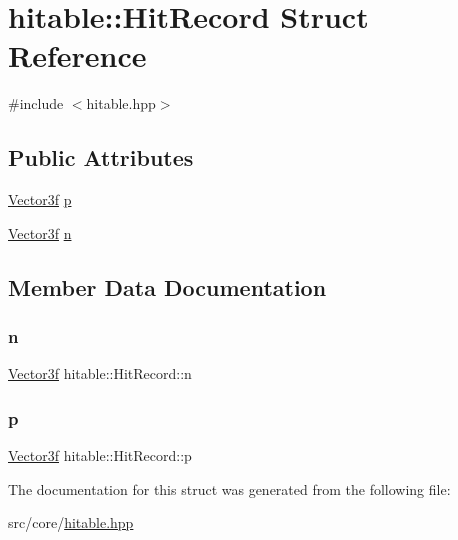\hypertarget{structhitable_1_1HitRecord}{}\section{hitable\+::Hit\+Record Struct Reference}
\label{structhitable_1_1HitRecord}


{\ttfamily \#include $<$hitable.\+hpp$>$}

\subsection*{Public Attributes}
\begin{DoxyCompactItemize}
\item 
\mbox{\hyperlink{cyclop_8hpp_a5a0a2e85b081623ef3f7e7e8d43024f5}{Vector3f}} \mbox{\hyperlink{structhitable_1_1HitRecord_a9a5814e14b0e26347c83fbebc94d9988}{p}}
\item 
\mbox{\hyperlink{cyclop_8hpp_a5a0a2e85b081623ef3f7e7e8d43024f5}{Vector3f}} \mbox{\hyperlink{structhitable_1_1HitRecord_a8990e6258d829d0a1c83c7a053cb4891}{n}}
\end{DoxyCompactItemize}


\subsection{Member Data Documentation}
\mbox{\label{structhitable_1_1HitRecord_a8990e6258d829d0a1c83c7a053cb4891}} 
\subsubsection{\texorpdfstring{n}{n}}
{\footnotesize\ttfamily \mbox{\hyperlink{cyclop_8hpp_a5a0a2e85b081623ef3f7e7e8d43024f5}{Vector3f}} hitable\+::\+Hit\+Record\+::n}

\mbox{\label{structhitable_1_1HitRecord_a9a5814e14b0e26347c83fbebc94d9988}} 
\subsubsection{\texorpdfstring{p}{p}}
{\footnotesize\ttfamily \mbox{\hyperlink{cyclop_8hpp_a5a0a2e85b081623ef3f7e7e8d43024f5}{Vector3f}} hitable\+::\+Hit\+Record\+::p}



The documentation for this struct was generated from the following file\+:\begin{DoxyCompactItemize}
\item 
src/core/\mbox{\hyperlink{hitable_8hpp}{hitable.\+hpp}}\end{DoxyCompactItemize}
